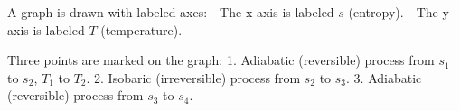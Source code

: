 A graph is drawn with labeled axes:  
- The x-axis is labeled \( s \) (entropy).  
- The y-axis is labeled \( T \) (temperature).  

Three points are marked on the graph:  
1. Adiabatic (reversible) process from \( s_1 \) to \( s_2 \), \( T_1 \) to \( T_2 \).  
2. Isobaric (irreversible) process from \( s_2 \) to \( s_3 \).  
3. Adiabatic (reversible) process from \( s_3 \) to \( s_4 \).